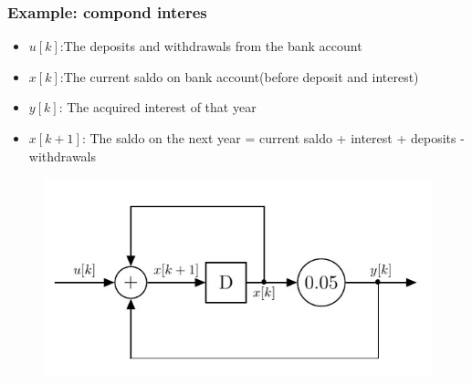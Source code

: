 \begin{frame}
	\frametitle{Example: compond interes}
	\begin{itemize}
			\item $ u[k]$:The deposits and withdrawals from the bank account
			\item $ x[k]$:The current saldo on bank account(before deposit and interest)
			\item $ y[k]$: The acquired interest of that year
			\item $ x[k+1]$: The saldo on the next year = current saldo + interest + deposits - withdrawals
	\end{itemize}

	\begin{figure}
		\centering
		\includegraphics[height=0.4\textheight]{Images/discrete_time_systems_3}
	\end{figure}
\end{frame}
%	
%
